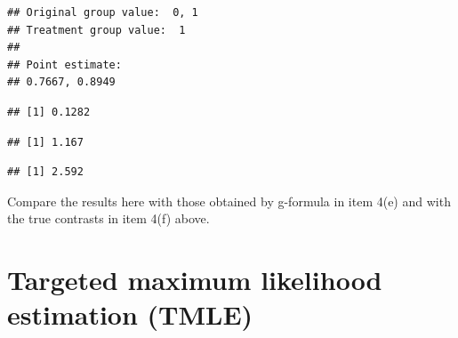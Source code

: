 \documentclass[
]{book}
\newenvironment{Shaded}{\begin{snugshade}}{\end{snugshade}}
\newcommand{\AttributeTok}[1]{\textcolor[rgb]{0.13,0.29,0.53}{#1}}
\newcommand{\DecValTok}[1]{\textcolor[rgb]{0.00,0.00,0.81}{#1}}
\newcommand{\FunctionTok}[1]{\textcolor[rgb]{0.13,0.29,0.53}{\textbf{#1}}}
\newcommand{\NormalTok}[1]{#1}
\newcommand{\SpecialCharTok}[1]{\textcolor[rgb]{0.81,0.36,0.00}{\textbf{#1}}}
\newcommand{\StringTok}[1]{\textcolor[rgb]{0.31,0.60,0.02}{#1}}
\begin{document}
\begin{verbatim}
## Original group value:  0, 1 
## Treatment group value:  1 
## 
## Point estimate: 
## 0.7667, 0.8949
\end{verbatim}

\begin{Shaded}
\end{Shaded}

\begin{verbatim}
## [1] 0.1282
\end{verbatim}

\begin{Shaded}
\end{Shaded}

\begin{verbatim}
## [1] 1.167
\end{verbatim}

\begin{Shaded}
\end{Shaded}

\begin{verbatim}
## [1] 2.592
\end{verbatim}

Compare the results here with those
obtained by g-formula in item 4(e) and with the
true contrasts in item 4(f) above.

\section{Targeted maximum likelihood estimation (TMLE)}\label{targeted-maximum-likelihood-estimation-tmle}
\end{document}
